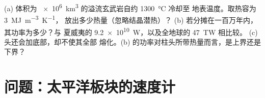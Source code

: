 \begin{exercise}[$\star\star\star$]\label{exo:b1:hotspots:12}
(a) 体积为 \qty{e6}{km^3} 的溢流玄武岩自约 \qty{1300}{\celsius} 冷却至
地表温度。取热容为 \qty{3}{MJ.m^{-3}.K^{-1}}，
放出多少热量（忽略结晶潜热）？
(b) 若分摊在一百万年内，其功率为多少？与
夏威夷的 \qty{9.2e10}{W}，以及全地球的 \qty{47}{TW} 相比较。
(c) 头还会加底部，却不使其全部
熔化。(b) 的功率对柱头所带热量而言，是上界还是
下界？
\end{exercise}

\section{问题：太平洋板块的速度计}

